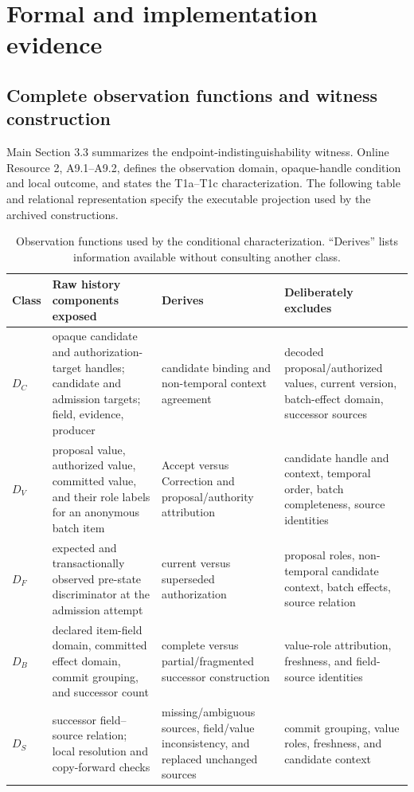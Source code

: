 \documentclass[11pt,a4paper]{article}
\begin{document}
\section{Formal and implementation evidence}
\label{app:formal-details}

\subsection{Complete observation functions and witness construction}

Main Section 3.3 summarizes the endpoint-indistinguishability witness. Online Resource 2, A9.1--A9.2, defines the observation domain, opaque-handle condition and local outcome, and states the T1a--T1c characterization. The following table and relational representation specify the executable projection used by the archived constructions.
\begin{table}[t]
\centering
\footnotesize
\caption{Observation functions used by the conditional characterization. ``Derives'' lists information available without consulting another class.}
\label{tab:observation-functions}
\begin{tabularx}{\textwidth}{@{}l>{\raggedright\arraybackslash}p{}>{\raggedright\arraybackslash}p{}>{\raggedright\arraybackslash}X@{}}
\toprule
Class & Raw history components exposed & Derives & Deliberately excludes \\
\midrule
$D_C$ & opaque candidate and authorization-target handles; candidate and admission targets; field, evidence, producer & candidate binding and non-temporal context agreement & decoded proposal/authorized values, current version, batch-effect domain, successor sources \\
$D_V$ & proposal value, authorized value, committed value, and their role labels for an anonymous batch item & Accept versus Correction and proposal/authority attribution & candidate handle and context, temporal order, batch completeness, source identities \\
$D_F$ & expected and transactionally observed pre-state discriminator at the admission attempt & current versus superseded authorization & proposal roles, non-temporal candidate context, batch effects, source relation \\
$D_B$ & declared item-field domain, committed effect domain, commit grouping, and successor count & complete versus partial/fragmented successor construction & value-role attribution, freshness, and field-source identities \\
$D_S$ & successor field--source relation; local resolution and copy-forward checks & missing/ambiguous sources, field/value inconsistency, and replaced unchanged sources & commit grouping, value roles, freshness, and candidate context \\
\bottomrule
\end{tabularx}
\end{table}
\end{document}
